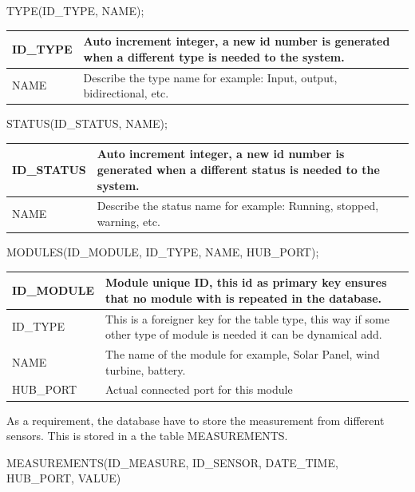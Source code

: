 TYPE(ID\_TYPE, NAME);

\begin{table}[H]
\centering
	\begin{tabular}{| p{2cm} | p{10cm} |}
		\hline
		ID\_TYPE & Auto increment integer, a new id number is generated when a different type is needed to the system. \\\hline
		NAME & Describe the type name for example: Input, output, bidirectional, etc.\\\hline
	\end{tabular}
\end{table}

STATUS(ID\_STATUS, NAME);

\begin{table}[H]
\centering
	\begin{tabular}{| p{2cm} | p{10cm} |}
		\hline
		ID\_STATUS & Auto increment integer, a new id number is generated when a different status is needed to the system. \\\hline
		NAME & Describe the status name for example: Running, stopped, warning, etc.\\\hline
	\end{tabular}
\end{table}


MODULES(ID\_MODULE, ID\_TYPE, NAME, HUB\_PORT);

\begin{table}[H]
\centering
	\begin{tabular}{| p{2cm} | p{10cm} |}
		\hline
		ID\_MODULE &  Module unique ID, this id as primary key ensures that no module with is repeated in the database.\\\hline
		ID\_TYPE & This is a foreigner key for the table type, this way if some other type of module is needed it can be dynamical add. \\\hline
		NAME & The name of the module for example, Solar Panel, wind turbine, battery. \\\hline
		HUB\_PORT & Actual connected port for this module\\\hline
	\end{tabular}
\end{table}

As a requirement, the database have to store the measurement  from different sensors. This is stored in a the table MEASUREMENTS.

MEASUREMENTS(ID\_MEASURE, ID\_SENSOR, DATE\_TIME, HUB\_PORT, VALUE)

